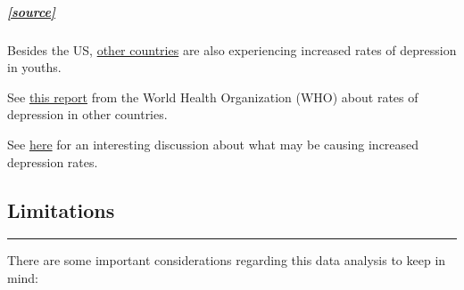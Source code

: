 \documentclass[
]{article}
\begin{document}
\hypertarget{source-7}{%
\subparagraph{\texorpdfstring{\href{https://time.com/5609124/us-suicide-rate-increase/}{{[}source{]}}}{{[}source{]}}}\label{source-7}}

Besides the US,
\href{https://academic.oup.com/ije/article/48/5/1650/5366210}{other
countries} are also experiencing increased rates of depression in
youths.

See
\href{https://apps.who.int/iris/bitstream/handle/10665/254610/WHO-MSD-MER-2017.2-eng.pdf;jsessionid=E44360055DD83EAC472AA40C2853DBFA?sequence=1}{this
report} from the World Health Organization (WHO) about rates of
depression in other countries.

See \href{https://www.ncbi.nlm.nih.gov/pmc/articles/PMC3330161/}{here}
for an interesting discussion about what may be causing increased
depression rates.

\hypertarget{limitations}{%
\subsection{\texorpdfstring{\textbf{Limitations}}{Limitations}}\label{limitations}}

\begin{center}\rule{0.5\linewidth}{0.5pt}\end{center}

There are some important considerations regarding this data analysis to
keep in mind:
\end{document}
